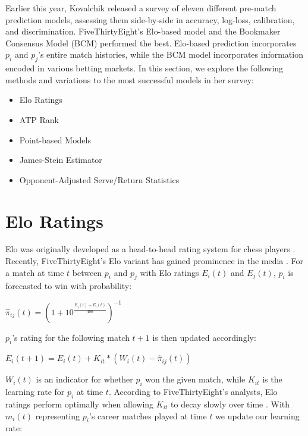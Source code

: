 \documentclass[chapterprefix=false]{report}
\begin{document}
Earlier this year, Kovalchik released a survey of eleven different pre-match prediction models, assessing them side-by-side in accuracy, log-loss, calibration, and discrimination. FiveThirtyEight's Elo-based model and the Bookmaker Consensus Model (BCM) performed the best. Elo-based prediction incorporates $p_i$ and $p_j$'s entire match histories, while the BCM model incorporates information encoded in various betting markets. In this section, we explore the following methods and variations to the most successful models in her survey:

\begin{itemize}
  \item Elo Ratings
  \item ATP Rank
  \item Point-based Models
  \item James-Stein Estimator
  \item Opponent-Adjusted Serve/Return Statistics
\end{itemize}


\section{Elo Ratings}
Elo was originally developed as a head-to-head rating system for chess players \citep{elo1978rating}. Recently, FiveThirtyEight's Elo variant has gained prominence in the media \citep{HowForecasting}. For a match at time $t$ between $p_i$ and $p_j$ with Elo ratings $E_i(t)$ and $E_j(t)$, $p_i$ is forecasted to win with probability:

\begin{center}
$\hat{\pi}_{ij}(t) = (1 + 10^{\tfrac{E_j(t)-E_i(t)}{400}})^{-1}$
\end{center}

$p_i$'s rating for the following match $t+1$ is then updated accordingly:

\begin{center}
$E_i(t+1) = E_i(t) + K_{it}*(W_i(t)-\hat{\pi}_{ij}(t))$
\end{center}

$W_i(t)$ is an indicator for whether $p_i$ won the given match, while $K_{it}$ is the learning rate for $p_i$ at time $t$. According to FiveThirtyEight's analysts, Elo ratings perform optimally when allowing $K_{it}$ to  decay slowly over time \citep{HowForecasting}. With $m_i(t)$ representing $p_i$'s career matches played at time $t$ we update our learning rate:
\end{document}
